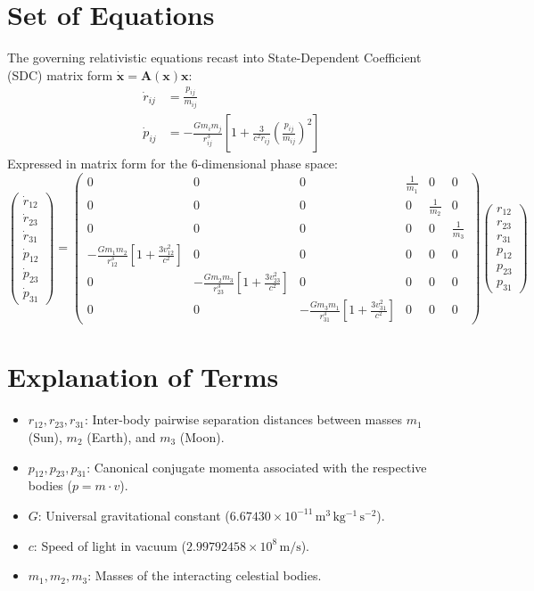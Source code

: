 \section{Set of Equations}
The governing relativistic equations recast into State-Dependent Coefficient (SDC) matrix form $\dot{\mathbf{x}} = \mathbf{A}(\mathbf{x})\mathbf{x}$:
\begin{align}
\dot{r}_{ij} &= \frac{p_{ij}}{m_{ij}} \\
\dot{p}_{ij} &= -\frac{G m_i m_j}{r_{ij}^3} \left[ 1 + \frac{3}{c^2 r_{ij}} \left(\frac{p_{ij}}{m_{ij}}\right)^2 \right]
\end{align}
Expressed in matrix form for the 6-dimensional phase space:
\begin{equation}
\begin{pmatrix} \dot{r}_{12} \\ \dot{r}_{23} \\ \dot{r}_{31} \\ \dot{p}_{12} \\ \dot{p}_{23} \\ \dot{p}_{31} \end{pmatrix} = \begin{pmatrix} 
0 & 0 & 0 & \frac{1}{m_1} & 0 & 0 \\ 
0 & 0 & 0 & 0 & \frac{1}{m_2} & 0 \\ 
0 & 0 & 0 & 0 & 0 & \frac{1}{m_3} \\ 
-\frac{G m_1 m_2}{r_{12}^3}\left[1 + \frac{3 v_{12}^2}{c^2}\right] & 0 & 0 & 0 & 0 & 0 \\ 
0 & -\frac{G m_2 m_3}{r_{23}^3}\left[1 + \frac{3 v_{23}^2}{c^2}\right] & 0 & 0 & 0 & 0 \\ 
0 & 0 & -\frac{G m_3 m_1}{r_{31}^3}\left[1 + \frac{3 v_{31}^2}{c^2}\right] & 0 & 0 & 0 
\end{pmatrix} \begin{pmatrix} r_{12} \\ r_{23} \\ r_{31} \\ p_{12} \\ p_{23} \\ p_{31} \end{pmatrix}
\end{equation}

\section{Explanation of Terms}
\begin{itemize}
    \item $r_{12}, r_{23}, r_{31}$: Inter-body pairwise separation distances between masses $m_1$ (Sun), $m_2$ (Earth), and $m_3$ (Moon).
    \item $p_{12}, p_{23}, p_{31}$: Canonical conjugate momenta associated with the respective bodies ($p = m \cdot v$).
    \item $G$: Universal gravitational constant ($6.67430 \times 10^{-11} \, \mathrm{m^3 \, kg^{-1} \, s^{-2}}$).
    \item $c$: Speed of light in vacuum ($2.99792458 \times 10^8 \, \mathrm{m/s}$).
    \item $m_1, m_2, m_3$: Masses of the interacting celestial bodies.
\end{itemize}

